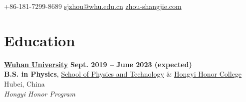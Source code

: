 \documentclass{resume}
\begin{document}
\begin{center}
    \contact
    {\normalsize +86-181-7299-8689}
    {\normalsize\href{mailto:sjzhou@whu.edu.cn}{sjzhou@whu.edu.cn}}
    {\normalsize\href{http://zhou-shangjie.com/}{zhou-shangjie.com}}
\end{center}

\section{Education}
\begin{content}

    {\href{https://www.whu.edu.cn}{\bf Wuhan University}} \hfill {\bf Sept. 2019 -- June 2023 (expected)} \\
    {\bf B.S. in Physics}, \href{https://physics.whu.edu.cn}{School of Physics and Technology} \& \href{https://hyxt.whu.edu.cn}{Hongyi Honor College} \hfill Hubei, China\\
    {\em Hongyi Honor Program}

    \sectionlineskip
\end{content}

\end{document}
